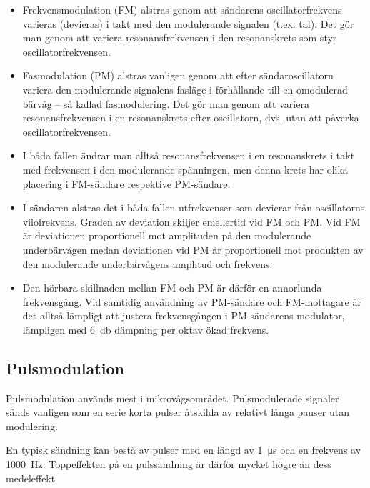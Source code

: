 \begin{itemize}
\item Frekvensmodulation (FM) alstras genom att sändarens oscillatorfrekvens
  varieras (devieras) i takt med den modulerande signalen (t.ex. tal).
  Det gör man genom att variera resonansfrekvensen i den resonanskrets som
  styr oscillatorfrekvensen.

\item Fasmodulation (PM) alstras vanligen genom att efter sändaroscillatorn
  variera den modulerande signalens fasläge i förhållande till en omodulerad
  bärvåg -- så kallad fasmodulering.
  Det gör man genom att variera resonansfrekvensen i en resonanskrets efter
  oscillatorn, dvs. utan att påverka oscillatorfrekvensen.

\item I båda fallen ändrar man alltså resonansfrekvensen i en resonanskrets i
  takt med frekvensen i den modulerande spänningen, men denna krets har
  olika placering i FM-sändare respektive PM-sändare.

\item I sändaren alstras det i båda fallen utfrekvenser som devierar från
  oscillatorns vilofrekvens.
  Graden av deviation skiljer emellertid vid FM och PM.
  Vid FM är deviationen proportionell mot amplituden på den modulerande
  underbärvågen medan deviationen vid PM är proportionell mot produkten av den
  modulerande underbärvågens amplitud och frekvens.

\item Den hörbara skillnaden mellan FM och PM är därför en annorlunda
  frekvensgång.
  Vid samtidig användning av PM-sändare och FM-mottagare är det alltså lämpligt
  att justera frekvensgången i PM-sändarens modulator, lämpligen
  med \qty{6}{\decibel} dämpning per oktav ökad frekvens.
\end{itemize}

\subsection{Pulsmodulation}

Pulsmodulation används mest i mikrovågsområdet.
Pulsmodulerade signaler sänds vanligen som en serie korta pulser åtskilda av
relativt långa pauser utan modulering.

En typisk sändning kan bestå av pulser med en längd av \qty{1}{\micro\second}
och en frekvens av \qty{1000}{\hertz}.
Toppeffekten på en pulssändning är därför mycket högre än dess medeleffekt

